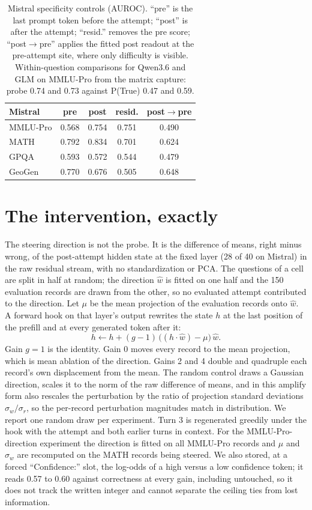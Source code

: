 \begin{table}[H]
\caption{Mistral specificity controls (AUROC). ``pre'' is the last prompt token before the attempt; ``post'' is after the attempt; ``resid.'' removes the pre score; ``post$\to$pre'' applies the fitted post readout at the pre-attempt site, where only difficulty is visible. Within-question comparisons for Qwen3.6 and GLM on MMLU-Pro from the matrix capture: probe 0.74 and 0.73 against P(True) 0.47 and 0.59.}
\label{tab:knowing}
\centering\small
\begin{tabular}{@{}lcccc@{}}
\toprule
\textbf{Mistral} & \textbf{pre} & \textbf{post} & \textbf{resid.} & \textbf{post$\to$pre} \\
\midrule
MMLU-Pro & 0.568 & 0.754 & 0.751 & 0.490 \\
MATH & 0.792 & 0.834 & 0.701 & 0.624 \\
GPQA & 0.593 & 0.572 & 0.544 & 0.479 \\
GeoGen & 0.770 & 0.676 & 0.505 & 0.648 \\
\bottomrule
\end{tabular}
\end{table}

\section{The intervention, exactly}
\label{app:intervention}
The steering direction is not the probe. It is the difference of means, right minus wrong, of the post-attempt hidden state at the fixed layer (28 of 40 on Mistral) in the raw residual stream, with no standardization or PCA. The questions of a cell are split in half at random; the direction $\hat{w}$ is fitted on one half and the 150 evaluation records are drawn from the other, so no evaluated attempt contributed to the direction. Let $\mu$ be the mean projection of the evaluation records onto $\hat{w}$. A forward hook on that layer's output rewrites the state $h$ at the last position of the prefill and at every generated token after it:
\[ h \leftarrow h + (g-1)\,\big((h\cdot\hat{w}) - \mu\big)\,\hat{w}. \]
Gain $g=1$ is the identity. Gain $0$ moves every record to the mean projection, which is mean ablation of the direction. Gains 2 and 4 double and quadruple each record's own displacement from the mean. The random control draws a Gaussian direction, scales it to the norm of the raw difference of means, and in this amplify form also rescales the perturbation by the ratio of projection standard deviations $\sigma_w/\sigma_r$, so the per-record perturbation magnitudes match in distribution. We report one random draw per experiment. Turn 3 is regenerated greedily under the hook with the attempt and both earlier turns in context. For the MMLU-Pro-direction experiment the direction is fitted on all MMLU-Pro records and $\mu$ and $\sigma_w$ are recomputed on the MATH records being steered. We also stored, at a forced ``Confidence:'' slot, the log-odds of a high versus a low confidence token; it reads 0.57 to 0.60 against correctness at every gain, including untouched, so it does not track the written integer and cannot separate the ceiling ties from lost information.

